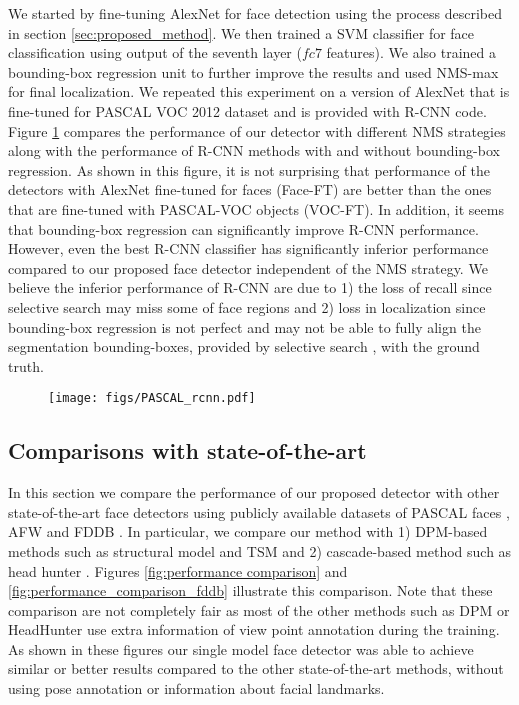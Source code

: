 \documentclass{sig-alternate-2013}
\begin{document}
We started by fine-tuning AlexNet for face detection using the process described in section \ref{sec:proposed_method}. We then trained a SVM classifier for face classification using output of the seventh layer  ($fc7$ features). We also trained a bounding-box regression unit to further improve the results and used NMS-max for final localization. We repeated this experiment on a version of AlexNet that is fine-tuned for PASCAL VOC 2012 dataset and is provided with R-CNN code. Figure \ref{fig:rcnn_results} compares the performance of our detector with different NMS strategies along with the performance of R-CNN methods with and without bounding-box regression. As shown in this figure, it is not surprising that performance of the detectors with
AlexNet fine-tuned for faces (Face-FT) are better than the ones that are fine-tuned with PASCAL-VOC objects (VOC-FT). In addition, it seems that bounding-box regression can significantly improve R-CNN performance. However, even the best R-CNN classifier has significantly inferior performance compared to our proposed face detector independent of the NMS strategy. We believe the inferior performance of R-CNN are due to 1) the loss of recall since selective search may miss some of face regions and 2) loss in localization since bounding-box regression is not perfect and may not be able to fully align the segmentation bounding-boxes, provided by selective search \cite{selective_search}, with the ground truth.

\begin{figure}[t]
  \centering
    \texttt{[image: figs/PASCAL\_rcnn.pdf]}
  \caption{} 
  \label{fig:rcnn_results} 
  \vspace{-.1in}
\end{figure} 

\subsection{Comparisons with state-of-the-art} 

In this section we compare the performance of our proposed detector with other state-of-the-art face detectors using publicly available datasets of  PASCAL faces \cite{structural_model}, AFW \cite{tsm} and FDDB \cite{fddb}. In particular, we compare our method with 1) DPM-based methods such as structural model \cite{structural_model} and TSM \cite{tsm} and 2) cascade-based method such as head hunter \cite{head_hunter}. Figures \ref{fig:performance comparison} and \ref{fig:performance_comparison_fddb} illustrate this comparison. Note that these comparison are not completely fair as most of the other methods such as DPM or HeadHunter use extra information of view point annotation during the training. As shown in these figures our single model face detector was able to achieve similar or better results compared to the other state-of-the-art methods, without using pose annotation or information about facial landmarks.
\end{document}
